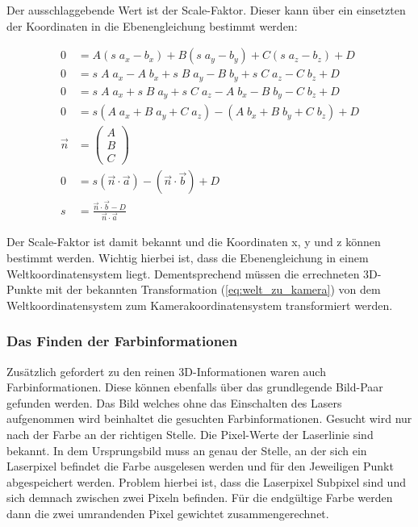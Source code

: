 	Der ausschlaggebende Wert ist der Scale-Faktor. Dieser kann über ein einsetzten der Koordinaten in die Ebenengleichung bestimmt werden:
	
	\begin{equation}
		\begin{aligned}
			0 &= A(s \; a_x - b_x) + B(s \; a_y - b_y) + C(s \; a_z - b_z) + D \\
			0 &= s \; A \; a_x - A \; b_x + s \; B \; a_y - B \; b_y + s \; C \; a_z - C \; b_z + D \\
			0 &= s \; A \; a_x + s \; B \; a_y + s \; C \; a_z - A \; b_x - B \; b_y - C \; b_z + D \\
			0 &= s(A \; a_x + B \; a_y + C \; a_z) - (A \; b_x + B \; b_y + C \; b_z) + D \\
			\vec{n} &= \begin{pmatrix}
			A \\
			B \\
			C
			\end{pmatrix} \\
			0 &= s(\vec{n} \cdot \vec{a}) - (\vec{n} \cdot \vec{b}) + D \\
			s &= \frac{\vec{n} \cdot \vec{b} - D}{\vec{n} \cdot \vec{a}}
		\end{aligned}
	\end{equation}
	
	Der Scale-Faktor ist damit bekannt und die Koordinaten x, y und z können bestimmt werden. Wichtig hierbei ist, dass die Ebenengleichung in einem Weltkoordinatensystem liegt. Dementsprechend müssen die errechneten 3D-Punkte mit der bekannten Transformation (\ref{eq:welt_zu_kamera}) von dem Weltkoordinatensystem zum Kamerakoordinatensystem transformiert werden.
	
	\subsubsection{Das Finden der Farbinformationen}
	
	Zusätzlich gefordert zu den reinen 3D-Informationen waren auch Farbinformationen. Diese können ebenfalls über das grundlegende Bild-Paar gefunden werden. Das Bild welches ohne das Einschalten des Lasers aufgenommen wird beinhaltet die gesuchten Farbinformationen. Gesucht wird nur nach der Farbe an der richtigen Stelle. Die Pixel-Werte der Laserlinie sind bekannt. In dem Ursprungsbild muss an genau der Stelle, an der sich ein Laserpixel befindet die Farbe ausgelesen werden und für den Jeweiligen Punkt abgespeichert werden. Problem hierbei ist, dass die Laserpixel Subpixel sind und sich demnach zwischen zwei Pixeln befinden. Für die endgültige Farbe werden dann die zwei umrandenden Pixel gewichtet zusammengerechnet.
	
